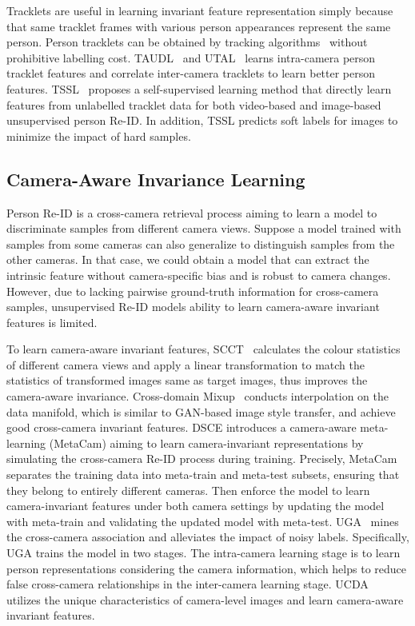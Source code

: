 \documentclass[a4paper,fleqn]{cas-dc}
\begin{document}
Tracklets are useful in learning invariant feature representation simply because that same tracklet frames with various person appearances represent the same person. Person  tracklets can be obtained by tracking algorithms~\cite{leal-taixe_motchallenge_2015,ristani_performance_2016,gao_graph_2019,gao_i_2019,zhang_deeper_2019} without prohibitive labelling cost. TAUDL~\cite{ferrari_unsupervised_2018} and UTAL~\cite{li_unsupervised_2020} learns intra-camera person tracklet features and correlate inter-camera tracklets to learn better person features. TSSL~\cite{wu_tracklet_2020} proposes a self-supervised learning method that directly learn features from unlabelled tracklet data for both video-based and image-based unsupervised person Re-ID. In addition, TSSL predicts soft labels for images to minimize the impact of hard samples. 

\subsection{Camera-Aware Invariance Learning}

Person Re-ID is a cross-camera retrieval process aiming to learn a model to discriminate samples from different camera views. Suppose a model trained with samples from some cameras can also generalize to distinguish samples from the other cameras. In that case, we could obtain a model that can extract the intrinsic feature without camera-specific bias and is robust to camera changes. However, due to lacking pairwise ground-truth information for cross-camera samples, unsupervised Re-ID models ability to learn camera-aware invariant features is limited.  

To learn camera-aware invariant features, SCCT~\cite{xiang_second-order_2020} calculates the colour statistics of different camera views and apply a linear transformation to match the statistics of transformed images same as target images, thus improves the camera-aware invariance. Cross-domain Mixup~\cite{vedaldi_generalizing_2020} conducts interpolation on the data manifold, which is similar to GAN-based image style transfer, and achieve good cross-camera invariant features. DSCE\cite{yang_joint_2021} introduces a camera-aware meta-learning (MetaCam) aiming to learn camera-invariant representations by simulating the cross-camera Re-ID process during training. Precisely, MetaCam separates the training data into meta-train and meta-test subsets, ensuring that they belong to entirely different cameras. Then enforce the model to learn camera-invariant features under both camera settings by updating the model with meta-train and validating the updated model with meta-test. UGA~\cite{wu_unsupervised_2019-1} mines the cross-camera association and alleviates the impact of noisy labels. Specifically, UGA trains the model in two stages. The intra-camera learning stage is to learn person representations considering the camera information, which helps to reduce false cross-camera relationships in the inter-camera learning stage. UCDA~\cite{qi_novel_2019} utilizes the unique characteristics of camera-level images and learn camera-aware invariant features.
\end{document}
